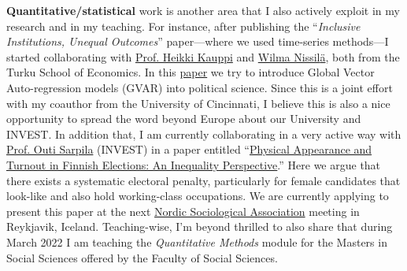 \documentclass[10pt,stdletter,dateno,sigleft]{newlfm} %
\begin{document}
\begin{newlfm}
{\bf Quantitative/statistical} work is another area that I also actively exploit in my research and in my teaching. For instance, after publishing the ``\emph{Inclusive Institutions, Unequal Outcomes}'' paper---where we used time-series methods---I started collaborating with \href{https://www.utu.fi/en/people/heikki-kauppi}{Prof. Heikki Kauppi} and \href{https://www.utu.fi/en/people/wilma-nissila}{Wilma Nissil{\"a}}, both from the Turku School of Economics. In this \href{https://github.com/hbahamonde/Bahamonde_Kovac/raw/master/abstract.txt}{paper} we try to introduce Global Vector Auto-regression models (GVAR) into political science. Since this is a joint effort with my coauthor from the University of Cincinnati, I believe this is also a nice opportunity to spread the word beyond Europe about our University and INVEST. In addition that, I am currently collaborating in a very active way with \href{https://www.utu.fi/en/people/outi-sarpila}{Prof. Outi Sarpila} (INVEST) in a paper entitled ``\href{https://raw.githubusercontent.com/hbahamonde/Physical/main/abstract.txt}{Physical Appearance and Turnout in Finnish Elections: An Inequality Perspective}.'' Here we argue that there exists a systematic electoral penalty, particularly for female candidates that look-like and also hold working-class occupations. We are currently applying to present this paper at the next \href{https://nsa2022.is}{Nordic Sociological Association} meeting in Reykjavik, Iceland. Teaching-wise, I'm beyond thrilled to also share that during March 2022 I am teaching the \emph{Quantitative Methods} module for the Masters in Social Sciences offered by the Faculty of Social Sciences. 


\end{newlfm}
\end{document}
